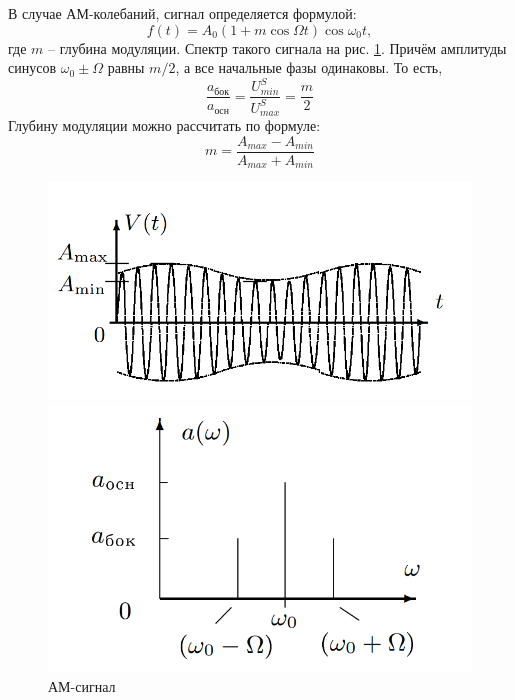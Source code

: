 \documentclass[a4paper]{article}
\begin{document}
В случае АМ-колебаний, сигнал определяется формулой:
\begin{equation}\label{key}
	f(t) = A_0 \left(1+m \cos \Omega t \right) \cos \omega_0 t,
\end{equation}
где $ m $ -- глубина модуляции.
Спектр такого сигнала на рис. \ref{fig:AM}. Причём амплитуды синусов $ \omega_0 \pm \Omega $ равны $ m/2 $, а все начальные фазы одинаковы. То есть,
\begin{equation}\label{new}
	\frac{a_{бок}}{a_{осн}} = \frac{U_{min}^S}{U_{max}^S} = \frac{m}{2}
\end{equation} Глубину модуляции можно рассчитать по формуле:
\begin{equation}\label{m}
	m = \frac{A_{max}-A_{min}}{A_{max}+A_{min}}
\end{equation}
\begin{figure}[h]
	\begin{minipage}{0.49\linewidth}
		\centering
		\includegraphics[width=0.9\linewidth]{"AM"}
	\end{minipage}
	\begin{minipage}{0.49\linewidth}
		\centering
		\includegraphics[width=0.9\linewidth]{"spAM"}
	\end{minipage}
	\caption{АМ-сигнал}
	\label{fig:AM}
\end{figure}
\end{document}
